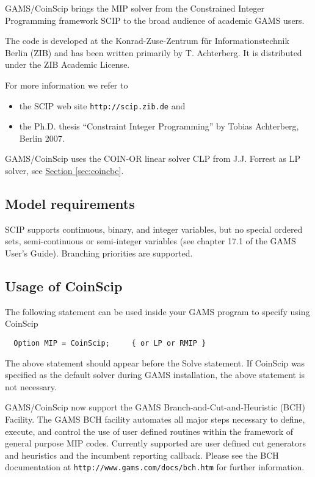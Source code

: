 GAMS/CoinScip brings the MIP solver from the Constrained Integer Programming framework SCIP to the broad audience of academic GAMS users.

The code is developed at the Konrad-Zuse-Zentrum f\"ur Informationstechnik Berlin (ZIB) and has been written primarily by T. Achterberg.
It is distributed under the ZIB Academic License.

For more information we refer to
\begin{itemize}
\item the SCIP web site \texttt{http://scip.zib.de} and
\item the Ph.D. thesis ``Constraint Integer Programming'' by Tobias Achterberg, Berlin 2007.
\end{itemize}

GAMS/CoinScip uses the COIN-OR linear solver CLP from J.J. Forrest as LP solver, see \hyperlink{sec:coincbc}{Section \ref{sec:coincbc}}.

\subsection{Model requirements}

SCIP supports continuous, binary, and integer variables, but no special ordered sets, semi-continuous or semi-integer variables (see chapter 17.1 of the GAMS User's Guide).
Branching priorities are supported.

\subsection{Usage of CoinScip}

The following statement can be used inside your GAMS program to specify using CoinScip
\begin{verbatim}
  Option MIP = CoinScip;     { or LP or RMIP }
\end{verbatim}

The above statement should appear before the Solve statement.
If CoinScip was specified as the default solver during GAMS installation, the above statement is not necessary.

GAMS/CoinScip now support the GAMS Branch-and-Cut-and-Heuristic (BCH) Facility.
The GAMS BCH facility automates all major steps necessary to define, execute, and control the use of user defined routines within the framework of general purpose MIP codes.
Currently supported are user defined cut generators and heuristics and the incumbent reporting callback.
Please see the BCH documentation at \texttt{http://www.gams.com/docs/bch.htm} for further information.


